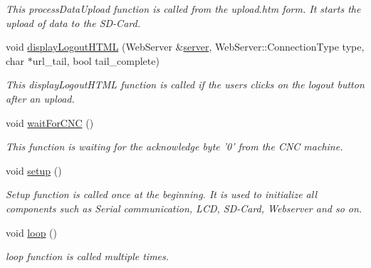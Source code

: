 \begin{DoxyCompactItemize}
\begin{DoxyCompactList}\small\item\em This process\-Data\-Upload function is called from the upload.\-htm form. It starts the upload of data to the S\-D-\/\-Card. \end{DoxyCompactList}\item 
void \hyperlink{_c_n_c_interface_8ino_af4f94536b200cf600ea553bfb6b3f6e5}{display\-Logout\-H\-T\-M\-L} (Web\-Server \&\hyperlink{_c_n_c_interface_8ino_a8373b6775f224fbef31c06c5ea115773}{server}, Web\-Server\-::\-Connection\-Type type, char $\ast$url\-\_\-tail, bool tail\-\_\-complete)
\begin{DoxyCompactList}\small\item\em This display\-Logout\-H\-T\-M\-L function is called if the users clicks on the logout button after an upload. \end{DoxyCompactList}\item 
\hypertarget{_c_n_c_interface_8ino_affaf0c21bd5a1567a6ec074483383a91}{void \hyperlink{_c_n_c_interface_8ino_affaf0c21bd5a1567a6ec074483383a91}{wait\-For\-C\-N\-C} ()}\label{_c_n_c_interface_8ino_affaf0c21bd5a1567a6ec074483383a91}

\begin{DoxyCompactList}\small\item\em This function is waiting for the acknowledge byte '0' from the C\-N\-C machine. \end{DoxyCompactList}\item 
\hypertarget{_c_n_c_interface_8ino_a4fc01d736fe50cf5b977f755b675f11d}{void \hyperlink{_c_n_c_interface_8ino_a4fc01d736fe50cf5b977f755b675f11d}{setup} ()}\label{_c_n_c_interface_8ino_a4fc01d736fe50cf5b977f755b675f11d}

\begin{DoxyCompactList}\small\item\em Setup function is called once at the beginning. It is used to initialize all components such as Serial communication, L\-C\-D, S\-D-\/\-Card, Webserver and so on. \end{DoxyCompactList}\item 
void \hyperlink{_c_n_c_interface_8ino_afe461d27b9c48d5921c00d521181f12f}{loop} ()
\begin{DoxyCompactList}\small\item\em loop function is called multiple times. \end{DoxyCompactList}\end{DoxyCompactItemize}
